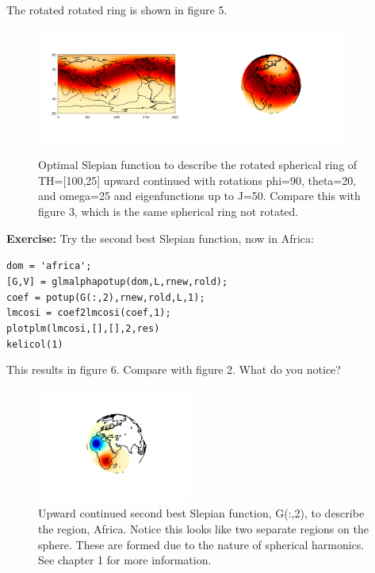 \documentclass[11pt]{article}
\begin{document}
The rotated rotated ring is shown in figure 5.

\begin{figure}[H]
  \centering
  \includegraphics[width=0.45\textwidth]{figures/rot100_25flat.png}
  \includegraphics[width=0.45\textwidth]{figures/rot100_25.png}
  \caption{Optimal Slepian function to describe the rotated spherical ring of TH=[100,25] upward continued with rotations phi=90, theta=20, and omega=25 and eigenfunctions up to J=50.  Compare this with figure 3, which is the same spherical ring not rotated.}
\label{Grot10025}
\end{figure}

\textbf{Exercise:} Try the second best Slepian function, now in Africa:

\verb+dom = 'africa';+\\
\verb+[G,V] = glmalphapotup(dom,L,rnew,rold);+\\
\verb+coef = potup(G(:,2),rnew,rold,L,1);+\\
\verb+lmcosi = coef2lmcosi(coef,1);+\\
\verb+plotplm(lmcosi,[],[],2,res)+\\
\verb+kelicol(1)+

This results in figure 6.  Compare with figure 2.  What do you notice?

\begin{figure}[H]
  \centering
  \includegraphics[width=0.45\textwidth]{figures/G(:,2)ml.png}
  \caption{Upward continued second best Slepian function, G(:,2), to describe the region, Africa.  Notice this looks like two separate regions on the sphere.  These are formed due to the nature of spherical harmonics.  See chapter 1 for more information.}
\label{G(:,2)}
\end{figure}
\end{document}
